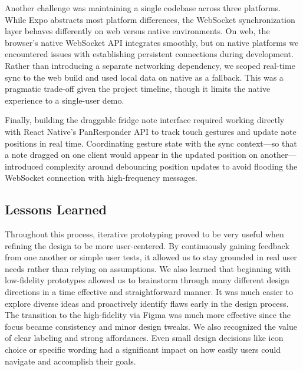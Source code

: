 \documentclass[sigconf]{acmart}
\begin{document}
Another challenge was maintaining a single codebase across three platforms. While Expo abstracts most platform differences, the WebSocket synchronization layer behaves differently on web versus native environments. On web, the browser's native WebSocket API integrates smoothly, but on native platforms we encountered issues with establishing persistent connections during development. Rather than introducing a separate networking dependency, we scoped real-time sync to the web build and used local data on native as a fallback. This was a pragmatic trade-off given the project timeline, though it limits the native experience to a single-user demo.

Finally, building the draggable fridge note interface required working directly with React Native's PanResponder API to track touch gestures and update note positions in real time. Coordinating gesture state with the sync context---so that a note dragged on one client would appear in the updated position on another---introduced complexity around debouncing position updates to avoid flooding the WebSocket connection with high-frequency messages.

\subsection{Lessons Learned}
Throughout this process, iterative prototyping proved to be very useful when refining the design to be more user-centered. By continuously gaining feedback from one another or simple user tests, it allowed us to stay grounded in real user needs rather than relying on assumptions. We also learned that beginning with low-fidelity prototypes allowed us to brainstorm through many different design directions in a time effective and straightforward manner. It was much easier to explore diverse ideas and proactively identify flaws early in the design process. The transition to the high-fidelity via Figma was much more effective since the focus became consistency and minor design tweaks. We also recognized the value of clear labeling and strong affordances. Even small design decisions like icon choice or specific wording had a significant impact on how easily users could navigate and accomplish their goals.
\end{document}
